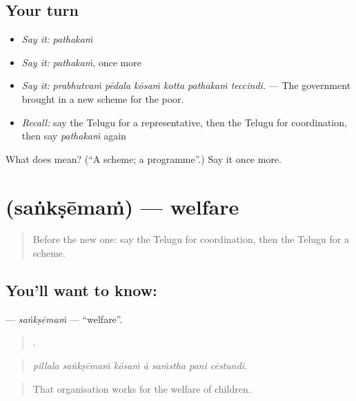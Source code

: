 \subsection*{Your turn}
\begin{itemize}
\raggedright
  \item \emph{Say it:} \emph{pathakaṁ}
  \item \emph{Say it:} \emph{pathakaṁ}, once more
  \item \emph{Say it:} \emph{prabhutvaṁ pēdala kōsaṁ kotta pathakaṁ teccindi.} — The government brought in a new scheme for the poor.
  \item \emph{Recall:} say the Telugu for a representative, then the Telugu for coordination, then say \emph{pathakaṁ} again
\end{itemize}

\begin{tcolorbox}[breakable,colback=teal!4,colframe=teal!35!black,title={Before you move on}]
What does  mean? (\textquotedblleft{}A scheme; a programme\textquotedblright{}.) Say it once more.
\end{tcolorbox}
\section[\texorpdfstring{\te{సంక్షేమం} (saṅkṣēmaṁ)}{సంక్షేమం (saṅkṣēmaṁ)}]{ (saṅkṣēmaṁ) — welfare}

\label{lesson:TE-C403-sanksemam}



\begin{quote}
Before the new one: say the Telugu for coordination, then the Telugu for a scheme.
\end{quote}

\subsection*{You'll want to know: }
\textbf{} — \emph{saṅkṣēmaṁ} — \textquotedblleft{}welfare\textquotedblright{}.

\begin{quote}
      .
\end{quote}

\begin{quote}
\emph{pillala saṅkṣēmaṁ kōsaṁ ā saṁstha pani cēstundi.}
\end{quote}

\begin{quote}
That organisation works for the welfare of children.
\end{quote}

